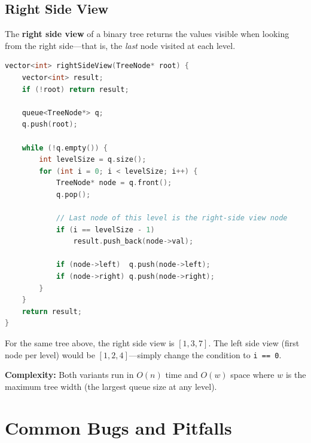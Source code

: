 \subsection{Right Side View}

The \textbf{right side view} of a binary tree returns the values visible when looking from the right side---that is, the \emph{last} node visited at each level.

\begin{lstlisting}[language=C++]
vector<int> rightSideView(TreeNode* root) {
    vector<int> result;
    if (!root) return result;

    queue<TreeNode*> q;
    q.push(root);

    while (!q.empty()) {
        int levelSize = q.size();
        for (int i = 0; i < levelSize; i++) {
            TreeNode* node = q.front();
            q.pop();

            // Last node of this level is the right-side view node
            if (i == levelSize - 1)
                result.push_back(node->val);

            if (node->left)  q.push(node->left);
            if (node->right) q.push(node->right);
        }
    }
    return result;
}
\end{lstlisting}

For the same tree above, the right side view is $[1, 3, 7]$. The left side view (first node per level) would be $[1, 2, 4]$---simply change the condition to \texttt{i == 0}.

\textbf{Complexity:} Both variants run in $O(n)$ time and $O(w)$ space where $w$ is the maximum tree width (the largest queue size at any level).

\section{Common Bugs and Pitfalls}


